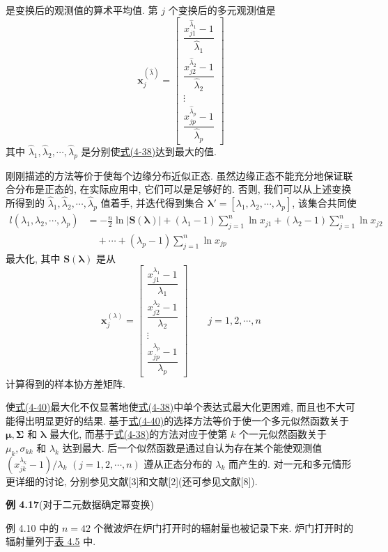
是变换后的观测值的算术平均值. 第 $j$ 个变换后的多元观测值是
\[
\mathbf{x}_j^{(\hat{\lambda})} = \begin{bmatrix} \dfrac{x_{j1}^{\hat{\lambda}_1} - 1}{\hat{\lambda}_1} \\[2.2ex] \dfrac{x_{j2}^{\hat{\lambda}_2} - 1}{\hat{\lambda}_2} \\[2.2ex] \vdots \\[2.2ex] \dfrac{x_{jp}^{\hat{\lambda}_p} - 1}{\hat{\lambda}_p} \end{bmatrix}
\]
其中 $\hat{\lambda}_1, \hat{\lambda}_2, \cdots, \hat{\lambda}_p$ 是分别使\hyperref[eq:4-38]{式(4-38)}达到最大的值.

刚刚描述的方法等价于使每个边缘分布近似正态. 虽然边缘正态不能充分地保证联合分布是正态的, 在实际应用中, 它们可以是足够好的. 否则, 我们可以从上述变换所得到的 $\hat{\lambda}_1, \hat{\lambda}_2, \cdots, \hat{\lambda}_p$ 值着手, 并迭代得到集合 $\boldsymbol{\lambda}' = [\lambda_1, \lambda_2, \cdots, \lambda_p]$, 该集合共同使
\label{eq:4-40}
\begin{align}
l(\lambda_1, \lambda_2, \cdots, \lambda_p) &= -\frac{n}{2}\ln |\mathbf{S}(\boldsymbol{\lambda})| + (\lambda_1 - 1)\sum_{j=1}^{n}\ln x_{j1} + (\lambda_2 - 1)\sum_{j=1}^{n}\ln x_{j2} \nonumber \\
&\quad + \cdots + (\lambda_p - 1)\sum_{j=1}^{n}\ln x_{jp} \tag{4-40}
\end{align}
最大化, 其中 $\mathbf{S}(\boldsymbol{\lambda})$ 是从
\[
\mathbf{x}_j^{(\lambda)} = \begin{bmatrix} \dfrac{x_{j1}^{\lambda_1} - 1}{\lambda_1} \\[2.2ex] \dfrac{x_{j2}^{\lambda_2} - 1}{\lambda_2} \\[2.2ex] \vdots \\[2.2ex] \dfrac{x_{jp}^{\lambda_p} - 1}{\lambda_p} \end{bmatrix} \qquad j = 1, 2, \cdots, n
\]
计算得到的样本协方差矩阵.

使\hyperref[eq:4-40]{式(4-40)}最大化不仅显著地使\hyperref[eq:4-38]{式(4-38)}中单个表达式最大化更困难, 而且也不大可能得出明显更好的结果. 基于\hyperref[eq:4-40]{式(4-40)}的选择方法等价于使一个多元似然函数关于 $\boldsymbol{\mu}, \boldsymbol{\Sigma}$ 和 $\boldsymbol{\lambda}$ 最大化, 而基于\hyperref[eq:4-38]{式(4-38)}的方法对应于使第 $k$ 个一元似然函数关于 $\mu_k, \sigma_{kk}$ 和 $\lambda_k$ 达到最大. 后一个似然函数是通过自认为存在某个能使观测值 $(x_{jk}^{\lambda_k} - 1)/\lambda_k$ $(j = 1, 2, \cdots, n)$ 遵从正态分布的 $\lambda_k$ 而产生的. 对一元和多元情形更详细的讨论, 分别参见文献[3]和文献[2](还可参见文献[8]).

\noindent\textbf{例 4.17}\quad (对于二元数据确定幂变换)

例 4.10 中的 $n = 42$ 个微波炉在炉门打开时的辐射量也被记录下来. 炉门打开时的辐射量列于\hyperref[tab:4.5]{表 4.5} 中.
